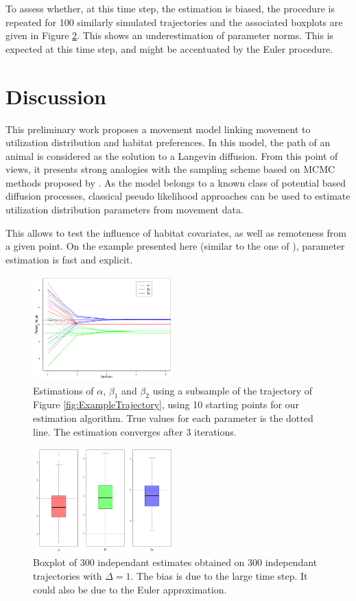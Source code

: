 \documentclass[10pt,a4paper, draft]{article}
\begin{document}
To assess whether, at this time step, the estimation is biased, the procedure is repeated for 100 similarly simulated trajectories and the associated boxplots are given in Figure \ref{fig:BoxplotParams}. This shows an underestimation of parameter norms. This is expected at this time step, and might be accentuated by the Euler procedure.

\section{Discussion}

This preliminary work proposes a movement model linking movement to utilization distribution and habitat preferences. In this model, the path of an animal is considered as the solution to a Langevin diffusion. From this point of views, it presents strong analogies with the sampling scheme  based on MCMC methods proposed by \cite{michelot2017linking}. As the model belongs to a known class of potential based diffusion processes, classical pseudo likelihood approaches can be used to estimate utilization distribution parameters from movement data. 

This allows to test the influence of habitat covariates, as well as remoteness from a given point. On the example presented here (similar to the one of \citealp{michelot2017linking}), parameter estimation is fast and explicit.

\begin{figure}
\centering
\includegraphics[width = 0.48\textwidth]{figures/ParamEstimation}
\caption{\label{fig:ParamsEstimation} Estimations of $\alpha$, $\beta_1$ and $\beta_2$ using a subsample of the trajectory of Figure \ref{fig:ExampleTrajectory}, using 10 starting points for our estimation algorithm. True values for each parameter is the dotted line. The estimation converges after 3 iterations.}
\end{figure}
\begin{figure}
\centering
\includegraphics[width = 0.48\textwidth]{figures/BoxplotParams}
\caption{\label{fig:BoxplotParams} Boxplot of 300 independant estimates obtained on 300 independant trajectories with $\Delta = 1$. The bias is due to the large time step. It could also be due to the Euler approximation.}
\end{figure}


\end{document}
